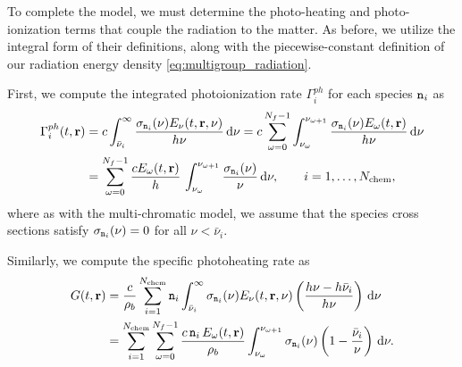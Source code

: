 \documentclass[10pt]{article}
\renewcommand{\(}{\left(}
\renewcommand{\)}{\right)}
\newcommand{\rvec}{{\bf r}}
\newcommand{\rhob}{\rho_b}
\newcommand{\Enu}{E_{\nu}}
\newcommand{\mn}{{\tt n}}
\begin{document}
To complete the model, we must determine the photo-heating and
photo-ionization terms that couple the radiation to the matter.  As
before, we utilize the integral form of their definitions, along with
the piecewise-constant definition of our radiation energy density
\eqref{eq:multigroup_radiation}.  

First, we compute the integrated photoionization rate $\Gamma_i^{ph}$
for each species $\mn_i$ as 
\begin{align}
\label{eq:multigroup_photoionization}
   \Gamma_i^{ph}(t,\rvec)  &= 
   c \int_{\bar{\nu}_i}^{\infty} \frac{\sigma_{\mn_i}(\nu)\Enu(t,\rvec,\nu)}{h\nu}\,\mathrm d\nu =  
   c \sum_{\omega=0}^{N_f-1} \int_{\nu_{\omega}}^{\nu_{\omega+1}} \frac{\sigma_{\mn_i}(\nu) E_{\omega}(t,\rvec)}{h\nu}\,\mathrm d\nu \\
\notag
   &= \sum_{\omega=0}^{N_f-1} \frac{c E_{\omega}(t,\rvec)}{h}\,
   \int_{\nu_{\omega}}^{\nu_{\omega+1}} \frac{\sigma_{\mn_i}(\nu)}{\nu}\,\mathrm
   d\nu, \qquad i=1,\ldots,N_\text{chem},
\end{align}
where as with the multi-chromatic model, we assume that the species
cross sections satisfy $\sigma_{\mn_i}(\nu) = 0$ for all $\nu <
\bar{\nu}_i$.

Similarly, we compute the specific photoheating rate as 
\begin{align}
\notag
   G(t,\rvec) &= 
   \frac{c}{\rhob} \sum_{i=1}^{N_\text{chem}} \mn_i
     \int_{\bar{\nu}_i}^{\infty} \sigma_{\mn_i}(\nu) \Enu(t,\rvec,\nu)
     \left(\frac{h\nu - h\bar{\nu}_i}{h\nu}\right)\,\mathrm d\nu \\
\label{eq:multigroup_photoheating}
     &= 
   \sum_{i=1}^{N_\text{chem}} \sum_{\omega=0}^{N_f-1} \frac{c\,\mn_i\, E_{\omega}(t,\rvec)}{\rhob} 
     \int_{\nu_{\omega}}^{\nu_{\omega+1}} \sigma_{\mn_i}(\nu) 
     \left(1 - \frac{\bar{\nu}_i}{\nu}\right)\,\mathrm d\nu.
\end{align}
\end{document}
